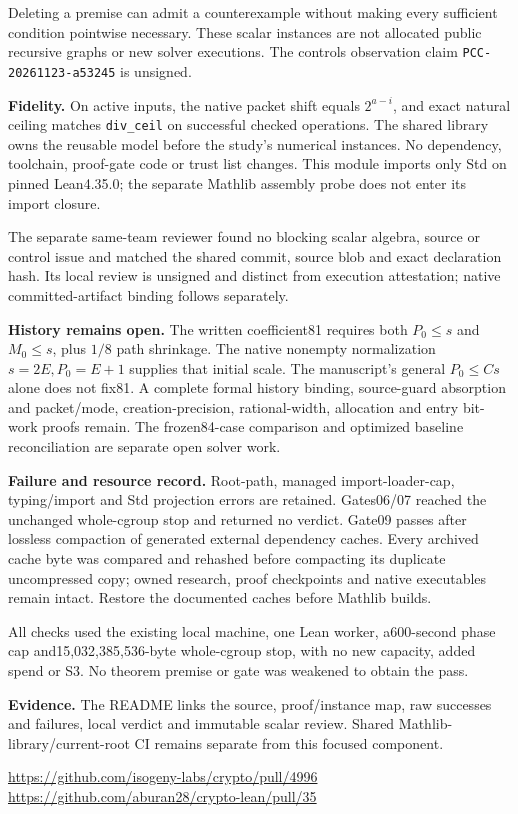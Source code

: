 \documentclass[10pt]{article}
\begin{document}
Deleting a premise can admit a counterexample without making every sufficient
condition pointwise necessary. These scalar instances are not allocated public
recursive graphs or new solver executions. The controls observation claim
\texttt{PCC-20261123-a53245} is unsigned.

\textbf{Fidelity.} On active inputs, the native packet shift equals
$2^{a-i}$, and exact natural ceiling matches \texttt{div\_ceil} on successful
checked operations. The shared library owns the reusable model before the
study's numerical instances. No dependency, toolchain, proof-gate code or trust
list changes. This module imports only Std on pinned Lean4.35.0; the separate
Mathlib assembly probe does not enter its import closure.

The separate same-team reviewer found no blocking scalar algebra, source or
control issue and matched the shared commit, source blob and exact declaration
hash. Its local review is unsigned and distinct from execution attestation;
native committed-artifact binding follows separately.

\textbf{History remains open.} The written coefficient81 requires both
$P_0\le s$ and $M_0\le s$, plus $1/8$ path shrinkage. The native nonempty
normalization $s=2E,P_0=E+1$ supplies that initial scale. The manuscript's
general $P_0\le Cs$ alone does not fix81. A complete formal history binding,
source-guard absorption and packet/mode, creation-precision, rational-width,
allocation and entry bit-work proofs remain. The frozen84-case comparison
and optimized baseline reconciliation are separate open solver work.

\textbf{Failure and resource record.} Root-path, managed import-loader-cap,
typing/import and Std projection errors are retained. Gates06/07 reached the
unchanged whole-cgroup stop and returned no verdict. Gate09 passes after
lossless compaction of generated external dependency caches. Every archived
cache byte was compared and rehashed before compacting its duplicate
uncompressed copy; owned research, proof checkpoints and native executables
remain intact. Restore the documented caches before Mathlib builds.

All checks used the existing local machine, one Lean worker, a600-second phase
cap and15,032,385,536-byte whole-cgroup stop, with no new capacity, added spend
or S3. No theorem premise or gate was weakened to obtain the pass.

\textbf{Evidence.} The README links the source, proof/instance map, raw
successes and failures, local verdict and immutable scalar review. Shared
Mathlib-library/current-root CI remains separate from this focused component.

\small \url{https://github.com/isogeny-labs/crypto/pull/4996}\quad
\url{https://github.com/aburan28/crypto-lean/pull/35}
\end{document}
